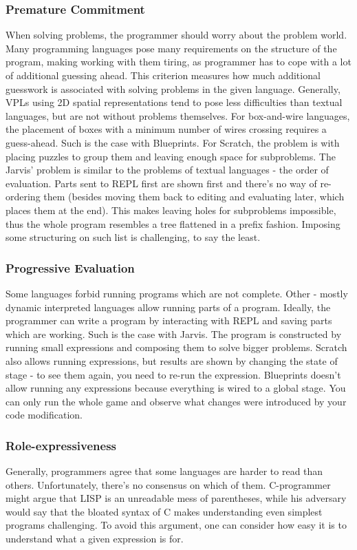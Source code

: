 \documentclass[11pt]{scrartcl}
\begin{document}
\subsubsection{Premature Commitment}
When solving problems, the programmer should worry about the problem world.
Many programming languages pose many requirements on the structure of the
program, making working with them tiring, as programmer has to cope with a lot
of additional guessing ahead.
This criterion measures how much additional guesswork is associated with solving
problems in the given language.
Generally, VPLs using 2D spatial representations tend to pose less difficulties
than textual languages, but are not without problems themselves.
For box-and-wire languages, the placement of boxes with a minimum number of
wires crossing requires a guess-ahead.
Such is the case with Blueprints.
For Scratch, the problem is with placing puzzles to group them and leaving
enough space for subproblems.
The Jarvis’ problem is similar to the problems of textual languages - the order
of evaluation.
Parts sent to REPL first are shown first and there’s no way of re-ordering them
(besides moving them back to editing and evaluating later, which places them at
the end).
This makes leaving holes for subproblems impossible, thus the whole program
resembles a tree flattened in a prefix fashion.
Imposing some structuring on such list is challenging, to say the least.

\subsubsection{Progressive Evaluation}
Some languages forbid running programs which are not complete.
Other - mostly dynamic interpreted languages allow running parts of a program.
Ideally, the programmer can write a program by interacting with REPL and saving
parts which are working.
Such is the case with Jarvis.
The program is constructed by running small expressions and composing them to
solve bigger problems.
Scratch also allows running expressions, but results are shown by changing the
state of stage - to see them again, you need to re-run the expression.
Blueprints doesn’t allow running any expressions because everything is wired to
a global stage.
You can only run the whole game and observe what changes were introduced by your
code modification.

\subsubsection{Role-expressiveness}
Generally, programmers agree that some languages are harder to read than others.
Unfortunately, there’s no consensus on which of them.
C-programmer might argue that LISP is an unreadable mess of parentheses, while
his adversary would say that the bloated syntax of C makes understanding even
simplest programs challenging.
To avoid this argument, one can consider how easy it is to understand what a
given expression is for.
\end{document}
